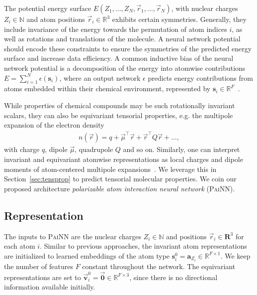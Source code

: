 \documentclass[reprint,
amsmath,amssymb,
 aip,jcp
]{revtex4-2}
\newcommand{\painn}{\textsc{PaiNN}}
\newcommand{\rr}{\vec{r}}
\newcommand{\q}{\mathbf{s}}
\newcommand{\mmu}{\vec{\mathbf{v}}}
\begin{document}
The potential energy surface $E(Z_1, \dots, Z_N, \rr_1, \dots, \rr_N)$, with nuclear charges $Z_i \in \mathbb{N}$ and atom positions $\rr_i \in \mathbb{R}^3$ exhibits certain symmetries.
Generally, they include invariance of the energy towards the permutation of atom indices $i$, as well as rotations and translations of the molecule.
A neural network potential should encode these constraints to ensure the symmetries of the predicted energy surface and increase data efficiency.
A common inductive bias of the neural network potential is a decomposition of the energy into atomwise contributions 
$E = \sum_{i=1}^{N} \epsilon(\mathbf{s}_i)$,
where an output network $\epsilon$ predicts energy contributions from atoms embedded within their chemical environment, represented by $\mathbf{s}_i \in \mathbb{R}^F$~\cite{behler2007generalized,bartok2013representing}.

While properties of chemical compounds may be such rotationally invariant scalars, they can also be equivariant tensorial properties, e.g. the multipole expansion of the electron density 
\begin{align}
n(\rr) = q + \vec{\mu}^\top \rr + \rr^\top Q \rr + \dots, \label{eq:mpexp}
\end{align}
with charge $q$, dipole $\vec{\mu}$, quadrupole $Q$ and so on.
Similarly, one can interpret invariant and equivariant atomwise representations as local charges and dipole moments of atom-centered multipole expansions~\cite{gastegger2020machine}.
We leverage this in Section~\ref{sec:tensprop} to predict tensorial molecular properties.
We coin our proposed architecture \emph{polarizable atom interaction neural network} (\painn{}).


\subsection{Representation}
The inputs to \painn{} are the nuclear charges $Z_i \in \mathbb{N}$ and positions $\rr_i \in \mathbf{R}^3$ for each atom $i$.
Similar to previous approaches, the invariant atom representations are initialized to learned embeddings of the atom type $\q_i^0 = \mathbf{a}_{Z_i} \in \mathbb{R}^{F \times 1}$. 
We keep the number of features $F$ constant throughout the network.
The equivariant representations are set to $\mmu_i^0 = \vec{\mathbf{0}} \in \mathbb{R}^{F \times 3}$, since there is no directional information available initially.
\end{document}
